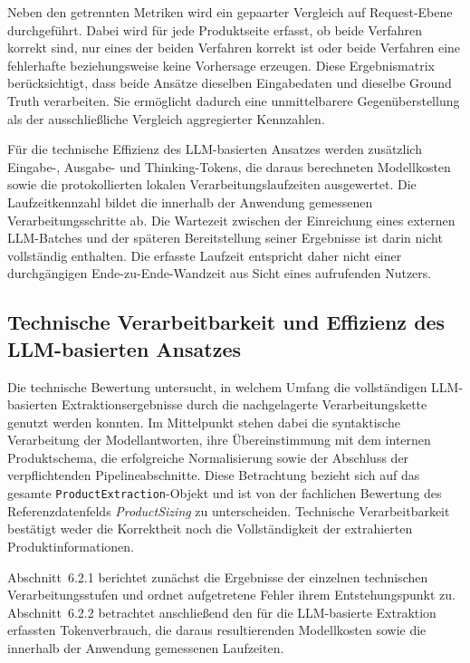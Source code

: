 Neben den getrennten Metriken wird ein gepaarter Vergleich auf Request-Ebene durchgeführt. Dabei wird für jede Produktseite erfasst, ob beide Verfahren korrekt sind, nur eines der beiden Verfahren korrekt ist oder beide Verfahren eine fehlerhafte beziehungsweise keine Vorhersage erzeugen. Diese Ergebnismatrix berücksichtigt, dass beide Ansätze dieselben Eingabedaten und dieselbe Ground Truth verarbeiten. Sie ermöglicht dadurch eine unmittelbarere Gegenüberstellung als der ausschließliche Vergleich aggregierter Kennzahlen.

Für die technische Effizienz des LLM-basierten Ansatzes werden zusätzlich Eingabe-, Ausgabe- und Thinking-Tokens, die daraus berechneten Modellkosten sowie die protokollierten lokalen Verarbeitungslaufzeiten ausgewertet. Die Laufzeitkennzahl bildet die innerhalb der Anwendung gemessenen Verarbeitungsschritte ab. Die Wartezeit zwischen der Einreichung eines externen LLM-Batches und der späteren Bereitstellung seiner Ergebnisse ist darin nicht vollständig enthalten. Die erfasste Laufzeit entspricht daher nicht einer durchgängigen Ende-zu-Ende-Wandzeit aus Sicht eines aufrufenden Nutzers.

\subsection{Technische Verarbeitbarkeit und Effizienz des LLM-basierten Ansatzes}

Die technische Bewertung untersucht, in welchem Umfang die vollständigen LLM-basierten Extraktionsergebnisse durch die nachgelagerte Verarbeitungskette genutzt werden konnten. Im Mittelpunkt stehen dabei die syntaktische Verarbeitung der Modellantworten, ihre Übereinstimmung mit dem internen Produktschema, die erfolgreiche Normalisierung sowie der Abschluss der verpflichtenden Pipelineabschnitte. Diese Betrachtung bezieht sich auf das gesamte \texttt{ProductExtraction}-Objekt und ist von der fachlichen Bewertung des Referenzdatenfelds \textit{ProductSizing} zu unterscheiden. Technische Verarbeitbarkeit bestätigt weder die Korrektheit noch die Vollständigkeit der extrahierten Produktinformationen.

Abschnitt~6.2.1 berichtet zunächst die Ergebnisse der einzelnen technischen Verarbeitungsstufen und ordnet aufgetretene Fehler ihrem Entstehungspunkt zu. Abschnitt~6.2.2 betrachtet anschließend den für die LLM-basierte Extraktion erfassten Tokenverbrauch, die daraus resultierenden Modellkosten sowie die innerhalb der Anwendung gemessenen Laufzeiten.

